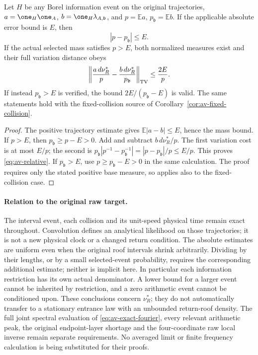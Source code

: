 \begin{corollary}
\label{cor:av-denominator}
Let $H$ be any Borel information event on the original trajectories,
$a=\one_H\one_A$, $b=\one_H\lambda_{A,\mathfrak b}$, and
$p=\mathbb E a$, $p_{\mathfrak b}=\mathbb E b$.  If the applicable
absolute error bound is $E$, then
\[
 |p-p_{\mathfrak b}|\le E.
\]
If the actual selected mass satisfies $p>E$, both normalized
measures exist and their full variation distance obeys
\begin{equation}\label{eq:av-relative}
 \left\|\frac{a\,d\nu_R^*}{p}
       -\frac{b\,d\nu_R^*}{p_{\mathfrak b}}\right\|_{\rm TV}
                                  \le\frac{2E}{p}.
\end{equation}
If instead $p_{\mathfrak b}>E$ is verified, the bound
$2E/(p_{\mathfrak b}-E)$ is valid.  The same statements hold with
the fixed-collision source of Corollary~\ref{cor:av-fixed-collision}.
\end{corollary}
\begin{proof}
The positive trajectory estimate gives $\mathbb E|a-b|\le E$,
hence the mass bound.  If $p>E$, then $p_{\mathfrak b}\ge p-E>0$.
Add and subtract $b\,d\nu_R^*/p$.  The first variation cost is
at most $E/p$; the second is
$p_{\mathfrak b}|p^{-1}-p_{\mathfrak b}^{-1}|
=|p-p_{\mathfrak b}|/p\le E/p$.  This proves
\eqref{eq:av-relative}.  If $p_{\mathfrak b}>E$, use
$p\ge p_{\mathfrak b}-E>0$ in the same calculation.  The proof
requires only the stated positive base measure, so applies also to
the fixed-collision case.
\end{proof}

\paragraph{Relation to the original raw target.}
The interval event, each collision and its unit-speed physical time
remain exact throughout.  Convolution defines an analytical
likelihood on those trajectories; it is not a new physical clock or
a changed return condition.  The absolute estimates are uniform even
when the original roof intervals shrink arbitrarily.  Dividing by
their lengths, or by a small selected-event probability, requires
the corresponding additional estimate; neither is implicit here.
In particular each information restriction has its own actual
denominator.  A lower bound for a larger event cannot be inherited
by restriction, and a zero arithmetic event cannot be conditioned
upon.  These conclusions concern $\nu_R^*$; they do not automatically
transfer to a stationary entrance law with an unbounded return-roof
density.  The full joint spectral evaluation of
\eqref{eq:av-exact-fourier}, every relevant arithmetic peak, the
original endpoint-layer shortage and the four-coordinate raw local
inverse remain separate requirements.  No averaged limit or finite
frequency calculation is being substituted for their proofs.
